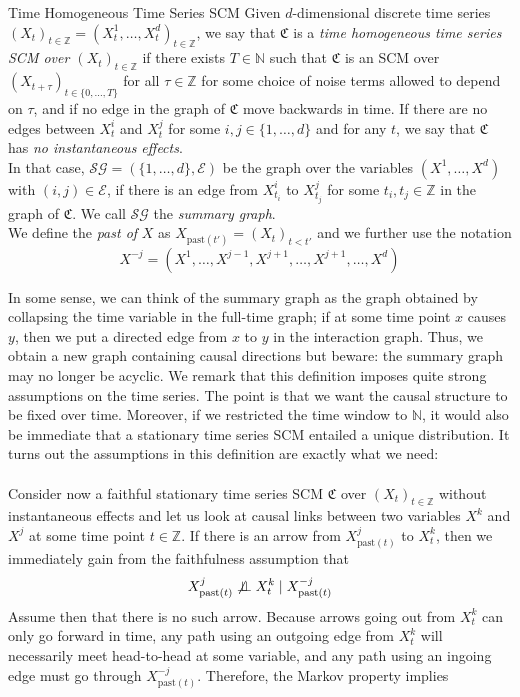 \documentclass[11pt, a4paper]{memoir}
\theoremstyle{break}
\theoremstyle{break}
\theoremstyle{nonumberplain}
\newcommand{\mN}{\mathbb{N}}
\newcommand{\mZ}{\mathbb{Z}}
\newcommand{\indep}{\perp \!\!\! \perp}
\begin{document}
\begin{mydefinition}{Time Homogeneous Time Series SCM}
Given $d$-dimensional discrete time series $(X_t)_{t\in \mZ}=(X_t^1,\ldots,X_t^d)_{t\in \mZ}$, we say that $\mathfrak{C}$ is a \emph{time homogeneous time series SCM over $(X_t)_{t\in \mZ}$} if there exists $T\in \mN$ such that $\mathfrak{C}$ is an SCM over $(X_{t+\tau})_{t\in \{0,\ldots,T\}}$ for all $\tau\in \mZ$ for some choice of noise terms allowed to depend on $\tau$, and if no edge in the graph of $\mathfrak{C}$ move backwards in time. If there are no edges between $X^i_t$ and $X^j_t$ for some $i,j\in \{1,\ldots,d\}$ and for any $t$, we say that $\mathfrak{C}$ has \emph{no instantaneous effects}.\\[5pt]
In that case, $\mathcal{SG}=(\{1,\ldots,d\},\mathcal{E})$ be the graph over the variables $(X^1,\ldots,X^d)$ with $(i,j)\in \mathcal{E}$, if there is an edge from $X_{t_i}^i$ to $X_{t_j}^j$ for some $t_i,t_j\in \mZ$ in the graph of $\mathfrak{C}$. We call $\mathcal{SG}$ the \emph{summary graph}.\\[5pt]
We define the \emph{past of} $X$ as $X_{\text{past}(t')}=(X_t)_{t<t'}$ and we further use the notation $$X^{-j}=(X^1,\ldots,X^{j-1},X^{j+1},\ldots, X^{j+1},\ldots,X^d)$$
\end{mydefinition}
\noindent In some sense, we can think of the summary graph as the graph obtained by collapsing the time variable in the full-time graph; if at some time point $x$ causes $y$, then we put a directed edge from $x$ to $y$ in the interaction graph. Thus, we obtain a new graph containing causal directions but beware: the summary graph may no longer be acyclic. We remark that this definition imposes quite strong assumptions on the time series. The point is that we want the causal structure to be fixed over time. Moreover, if we restricted the time window to $\mN$, it would also be immediate that a stationary time series SCM entailed a unique distribution. It turns out the assumptions in this definition are exactly what we need:\\\\
Consider now a faithful stationary time series SCM $\mathfrak{C}$ over $(X_t)_{t\in \mZ}$ without instantaneous effects and let us look at causal links between two variables $X^k$ and $X^j$ at some time point $t\in \mZ$. If there is an arrow from $X_{\text{past}(t)}^j$ to $X_t^k$, then we immediately gain from the faithfulness assumption that
$$X^j_{\text{past}(t)}\centernot\indep X_t^k\mid X^{-j}_{\text{past}(t)}$$
Assume then that there is no such arrow. Because arrows going out from $X_t^k$ can only go forward in time, any path using an outgoing edge from $X_t^k$ will necessarily meet head-to-head at some variable, and any path using an ingoing edge must go through $X^{-j}_{\text{past}(t)}$. Therefore, the Markov property implies 
\end{document}

